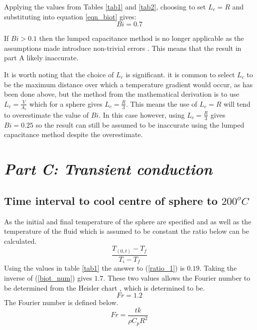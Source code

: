 \documentclass[11pt]{article}
\begin{document}
Applying the values from Tables \ref{tab1} and \ref{tab2}, choosing to set $L_{c}=R$ and substituting into equation \ref{eqn_biot} gives:
\begin{equation}\label{biot_num}
	Bi = 0.7
\end{equation}

If $Bi > 0.1$ then the lumped capacitance method is no longer applicable as the assumptions made introduce non-trivial errors \cite{bergman_fundamentals_2011}. This means that the result in part A likely inaccurate.

It is worth noting that the choice of $L_c$ is significant. it is common to select $L_c$ to be the maximum distance over which a temperature gradient would occur, as has been done above, but the method from the mathematical derivation is to use $L_c = \frac{V}{A_s}$ which for a sphere gives $L_c = \frac{R}{3}$. This means the use of $L_c = R$ will tend to overestimate the value of $Bi$. In this case however, using $L_c = \frac{R}{3}$ gives $Bi = 0.25$ so the result can still be assumed to be inaccurate using the lumped capacitance method despite the overestimate.

\section{\emph{Part C: Transient conduction}}
\subsection{Time interval to cool centre of sphere to $200 ^{o}C$}
As the initial and final temperature of the sphere are specified and as well as the temperature of the fluid which is assumed to be constant the ratio below can be calculated.
\begin{equation}\label{ratio_1}
	\frac{T_{(0,t)} -T_{f}}{T_{i} - T_{f}}
\end{equation}
Using the values in table \ref{tab1} the answer to (\ref{ratio_1}) is $0.19$. Taking the inverse of (\ref{biot_num}) gives $1.7$. These two values allows the Fourier number to be determined from the Heisler chart \cite{multidimensional-transient}, which is determined to be.
\begin{equation}\label{Fr_1}
	Fr = 1.2
\end{equation}
The Fourier number is defined below.
\begin{equation}\label{Fr_2}
	Fr = \frac{tk}{\rho C_{p} R^{2}}
\end{equation}
\end{document}
